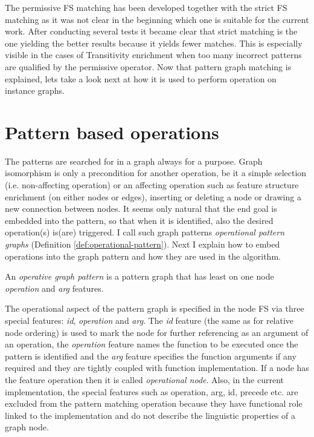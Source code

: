 The permissive FS matching has been developed together with the strict FS matching as it was not clear in the beginning which one is suitable for the current work. After conducting several tests it became clear that strict matching is the one yielding the better results because it yields fewer matches. This is especially visible in the cases of Transitivity enrichment when too many incorrect patterns are qualified by the permissive operator. Now that pattern graph matching is explained, lets take a look next at how it is used to perform operation on instance graphs.

\section{Pattern based operations}
\label{sec:pattern-based-operations}

The patterns are searched for in a graph always for a purpose. Graph isomorphism is only a precondition for another operation, be it a simple selection (i.e. non-affecting operation) or an affecting operation such as feature structure enrichment (on either nodes or edges), inserting or deleting a node or drawing a new connection between nodes. It seems only natural that the end goal is embedded into the pattern, so that when it is identified, also the desired operation(s) is(are) triggered. I call such graph patterns \textit{operational pattern graphs} (Definition \ref{def:operational-pattern}). Next I explain how to embed  operations into the graph pattern and how they are used in the algorithm. 

\begin{definition}\label{def:operational-pattern}
    An \textit{operative graph pattern} is a pattern graph that has least on one node \textit{operation} and \textit{arg} features.
\end{definition}

The operational aspect of the pattern graph is specified in the node FS via three special features: \textit{id}, \textit{operation} and \textit{arg}. The \textit{id} feature (the same as for relative node ordering) is used to mark the node for further referencing as an argument of an operation, the \textit{operation} feature names the function to be executed once the pattern is identified and the \textit{arg} feature specifies the function arguments if any required and they are tightly coupled with function implementation. If a node has the feature operation then it is called \textit{operational node}. Also, in the current implementation, the special features such as operation, arg, id, precede etc. are excluded from the pattern matching operation because they have functional role linked to the implementation and do not describe the linguistic properties of a graph node.

